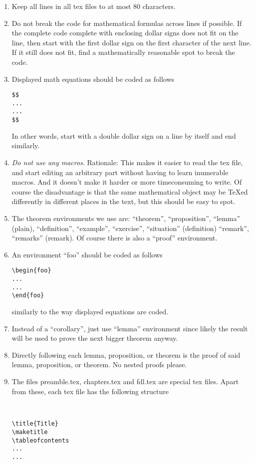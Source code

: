 \begin{enumerate}
\item Keep all lines in all tex files to at most 80 characters.
\item Do not break the code for mathematical formulas across
lines if possible. If the complete code complete with enclosing
dollar signs does not fit on the line, then start with the first
dollar sign on the first character of the next line. If it still
does not fit, find a mathematically reasonable spot to break
the code.
\item Displayed math equations should be coded as follows
\begin{verbatim}
$$
...
...
$$
\end{verbatim}
In other words, start with a double dollar sign on a line by itself
and end similarly.
\item {\it Do not use any macros}. Rationale: This makes it easier
to read the tex file, and start editing an arbitrary part
without having to learn inumerable macros.
And it doesn't make it harder or more timeconsuming to write.
Of course the disadvantage is that the same mathematical object
may be TeXed differently in different places in the text, but
this should be easy to spot.
\item The theorem environments we use are:
``theorem'', ``proposition'', ``lemma'' (plain),
``definition'', ``example'', ``exercise'', ``situation'' (definition)
``remark'', ``remarks'' (remark). Of course there is also
a ``proof'' environment.
\item An environment ``foo'' should be coded as follows
\begin{verbatim}
\begin{foo}
...
...
\end{foo}
\end{verbatim}
similarly to the way displayed equations are coded.
\item Instead of a ``corollary'', just use ``lemma'' environment
since likely the result will be used to prove the next bigger
theorem anyway.
\item Directly following each lemma, proposition, or theorem
is the proof of said lemma, proposition, or theorem. No nested
proofs please.
\item The files preamble.tex, chapters.tex and fdl.tex are special
tex files. Apart from these, each tex file
has the following structure
\begin{verbatim}


\title{Title}
\maketitle
\tableofcontents
...
...





\end{verbatim}
\end{enumerate}
